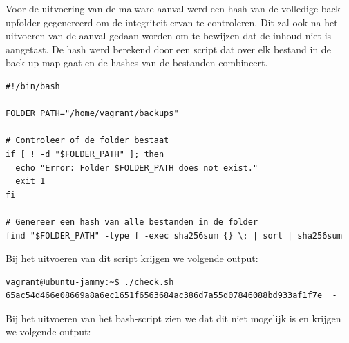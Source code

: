 Voor de uitvoering van de malware-aanval werd een hash van de volledige back-upfolder gegenereerd om de integriteit ervan te controleren. Dit zal ook na het uitvoeren van de aanval gedaan worden om te bewijzen dat de inhoud niet is aangetast. De hash werd berekend door een script dat over elk bestand in de back-up map gaat en de hashes van de bestanden combineert. 
\begin{lstlisting}[language=script, caption={Bash script om de hash te berekenen van de back-up map.}]
#!/bin/bash

FOLDER_PATH="/home/vagrant/backups"

# Controleer of de folder bestaat
if [ ! -d "$FOLDER_PATH" ]; then
  echo "Error: Folder $FOLDER_PATH does not exist."
  exit 1
fi

# Genereer een hash van alle bestanden in de folder
find "$FOLDER_PATH" -type f -exec sha256sum {} \; | sort | sha256sum
\end{lstlisting}
Bij het uitvoeren van dit script krijgen we volgende output:
\begin{lstlisting}[language=code, caption={Output van het script om de hash te berekenen.}]
vagrant@ubuntu-jammy:~$ ./check.sh
65ac54d466e08669a8a6ec1651f6563684ac386d7a55d07846088bd933af1f7e  -
\end{lstlisting}
Bij het uitvoeren van het bash-script zien we dat dit niet mogelijk is en krijgen we volgende output:
